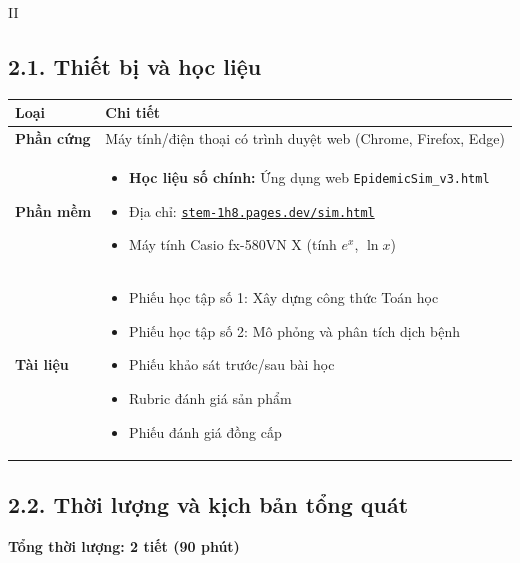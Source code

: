 \documentclass[12pt,a4paper]{article}
\newcommand{\header}[1]{\cellcolor{TableHeader}\sffamily\bfseries#1}
\begin{document}
\begin{competitionsection}{II}
\vspace{0.5cm}

\subsection*{2.1. Thiết bị và học liệu}

\begin{tabularx}{\textwidth}{@{} l X @{}}
\toprule
\header{Loại} & \header{Chi tiết} \\
\midrule
\textbf{Phần cứng} & Máy tính/điện thoại có trình duyệt web (Chrome, Firefox, Edge) \\
\midrule
\textbf{Phần mềm} & 
\begin{itemize}[nosep,leftmargin=*]
    \item \textbf{Học liệu số chính:} Ứng dụng web \texttt{EpidemicSim\_v3.html}
    \item Địa chỉ: \href{https://stem-1h8.pages.dev/sim.html}{\texttt{stem-1h8.pages.dev/sim.html}}
    \item Máy tính Casio fx-580VN X (tính $e^x$, $\ln x$)
\end{itemize} \\
\midrule
\textbf{Tài liệu} & 
\begin{itemize}[nosep,leftmargin=*]
    \item Phiếu học tập số 1: Xây dựng công thức Toán học
    \item Phiếu học tập số 2: Mô phỏng và phân tích dịch bệnh
    \item Phiếu khảo sát trước/sau bài học
    \item Rubric đánh giá sản phẩm
    \item Phiếu đánh giá đồng cấp
\end{itemize} \\
\bottomrule
\end{tabularx}

\subsection*{2.2. Thời lượng và kịch bản tổng quát}

\begin{center}
\textbf{Tổng thời lượng: 2 tiết (90 phút)}
\end{center}


\end{competitionsection}
\end{document}
